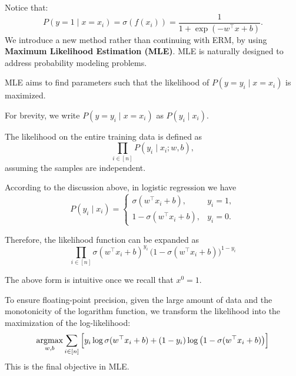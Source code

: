 \documentclass[../main]{subfiles}
\begin{document}
Notice that:
\begin{equation}
    P(y=1 \mid x = x_i) = \sigma(f(x_i)) = \frac{1}{1+\exp(-w^\top x + b)} .
\end{equation}
We introduce a new method rather than continuing with ERM, by using \textbf{Maximum Likelihood Estimation (MLE)}. 
MLE is naturally designed to address probability modeling problems.

\begin{definition}
    MLE aims to find parameters such that the likelihood of $P(y=y_i \mid x=x_i)$ is maximized.
\end{definition}

\begin{remark}
  For brevity, we write $P(y=y_i \mid x=x_i)$ as $P(y_i \mid x_i)$.
\end{remark}
\begin{definition}[Likelihood]
  The likelihood on the entire training data is defined as
  \begin{equation}
      \prod_{i \in [n]} P(y_i \mid x_i; w, b),
  \end{equation}
  assuming the samples are independent.
\end{definition}

According to the discussion above, in logistic regression we have
\begin{equation}
    P(y_i \mid x_i) =
    \begin{cases}
      \sigma(w^\top x_i + b), & y_i = 1, \\
      1 - \sigma(w^\top x_i + b), & y_i = 0.
    \end{cases}
\end{equation}

Therefore, the likelihood function can be expanded as
\begin{equation}
  \prod_{i \in [n]} \sigma(w^\top x_i + b)^{y_i} \,
  \big(1 - \sigma(w^\top x_i + b)\big)^{1-y_i}
\end{equation}

The above form is intuitive once we recall that $x^0 = 1$.

To ensure floating-point precision, given the large amount of data and the monotonicity of the logarithm function, 
we transform the likelihood into the maximization of the log-likelihood:
\begin{equation}
    \mathop{\mathrm{argmax}}_{w,b} \sum_{i \in [n]} 
    \Big[ y_i \log \sigma(w^\top x_i + b) 
    + (1-y_i) \log \big(1 - \sigma(w^\top x_i + b)\big) \Big]
\end{equation}
This is the final objective in MLE.
\end{document}
